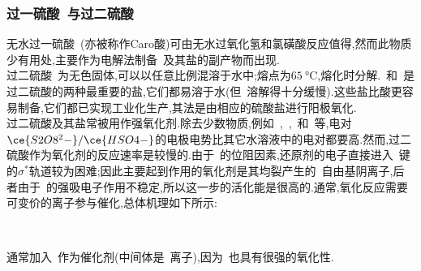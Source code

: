 \documentclass{ctexbook}
\begin{document}
\subsubsection{过一硫酸~与过二硫酸~}
无水过一硫酸~(亦被称作Caro酸)可由无水过氧化氢和氯磺酸反应值得,然而此物质少有用处,主要作为电解法制备~及其盐的副产物而出现.\\
\indent 过二硫酸~为无色固体,可以以任意比例混溶于水中;熔点为$\SI{65}{\celsius}$,熔化时分解.~和~是过二硫酸的两种最重要的盐,它们都易溶于水(但~溶解得十分缓慢).这些盐比酸更容易制备,它们都已实现工业化生产,其法是由相应的硫酸盐进行阳极氧化.\\
\indent 过二硫酸及其盐常被用作强氧化剂.除去少数物质,例如~,~,~和~等,电对$\ce{S2O8^2-}/\ce{HSO4-}$的电极电势比其它水溶液中的电对都要高.然而,过二硫酸作为氧化剂的反应速率是较慢的.由于~的位阻因素,还原剂的电子直接进入~键的$\sigma^\ast$轨道较为困难;因此主要起到作用的氧化剂是其均裂产生的~自由基阴离子,后者由于~的强吸电子作用不稳定,所以这一步的活化能是很高的.通常,氧化反应需要可变价的离子参与催化,总体机理如下所示:
\begin{tightcenter}
    \\
\end{tightcenter}
通常加入~作为催化剂(中间体是~离子),因为~也具有很强的氧化性.
\end{document}
